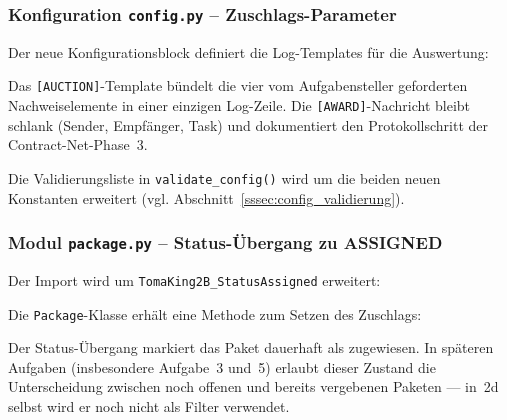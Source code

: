 
\subsubsection{Konfiguration \texttt{config.py} – Zuschlags-Parameter}

Der neue Konfigurationsblock definiert die Log-Templates für die Auswertung:



Das \texttt{[AUCTION]}-Template bündelt die vier vom Aufgabensteller geforderten Nachweiselemente in einer einzigen Log-Zeile. Die \texttt{[AWARD]}-Nachricht bleibt schlank (Sender, Empfänger, Task) und dokumentiert den Protokollschritt der Contract-Net-Phase~3.

Die Validierungsliste in \texttt{validate\_config()} wird um die beiden neuen Konstanten erweitert (vgl. Abschnitt~\ref{sssec:config_validierung}).


\subsubsection{Modul \texttt{package.py} – Status-Übergang zu ASSIGNED}

Der Import wird um \texttt{TomaKing2B\_StatusAssigned} erweitert:



Die \texttt{Package}-Klasse erhält eine Methode zum Setzen des Zuschlags:



Der Status-Übergang markiert das Paket dauerhaft als zugewiesen. In späteren Aufgaben (insbesondere Aufgabe~3 und~5) erlaubt dieser Zustand die Unterscheidung zwischen noch offenen und bereits vergebenen Paketen — in~2d selbst wird er noch nicht als Filter verwendet.

